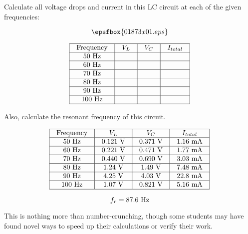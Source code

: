 

Calculate all voltage drops and current in this LC circuit at each of the given frequencies:

$$\epsfbox{01873x01.eps}$$


$$\vbox{\offinterlineskip
\halign{\strut
\vrule \quad\hfil # \ \hfil & 
\vrule \quad\hfil # \ \hfil & 
\vrule \quad\hfil # \ \hfil & 
\vrule \quad\hfil # \ \hfil \vrule \cr
\noalign{\hrule}
%
Frequency & $V_L$ & $V_C$ & $I_{total}$ \cr
%
\noalign{\hrule}
%
50 Hz &  &  & \cr
%
\noalign{\hrule}
%
60 Hz &  &  & \cr
%
\noalign{\hrule}
%
70 Hz &  &  & \cr
%
\noalign{\hrule}
%
80 Hz &  &  & \cr
%
\noalign{\hrule}
%
90 Hz &  &  & \cr
%
\noalign{\hrule}
%
100 Hz &  &  & \cr
%
\noalign{\hrule}
} %
}$$ %

Also, calculate the resonant frequency of this circuit.








$$\vbox{\offinterlineskip
\halign{\strut
\vrule \quad\hfil # \ \hfil & 
\vrule \quad\hfil # \ \hfil & 
\vrule \quad\hfil # \ \hfil & 
\vrule \quad\hfil # \ \hfil \vrule \cr
\noalign{\hrule}
%
Frequency & $V_L$ & $V_C$ & $I_{total}$ \cr
%
\noalign{\hrule}
%
50 Hz & 0.121 V & 0.371 V & 1.16 mA \cr
%
\noalign{\hrule}
%
60 Hz & 0.221 V & 0.471 V & 1.77 mA \cr
%
\noalign{\hrule}
%
70 Hz & 0.440 V & 0.690 V & 3.03 mA \cr
%
\noalign{\hrule}
%
80 Hz & 1.24 V & 1.49 V & 7.48 mA \cr
%
\noalign{\hrule}
%
90 Hz & 4.25 V & 4.03 V & 22.8 mA \cr
%
\noalign{\hrule}
%
100 Hz & 1.07 V & 0.821 V & 5.16 mA \cr
%
\noalign{\hrule}
} %
}$$ %

$$f_r = 87.6 \hbox{ Hz}$$







This is nothing more than number-crunching, though some students may have found novel ways to speed up their calculations or verify their work.




